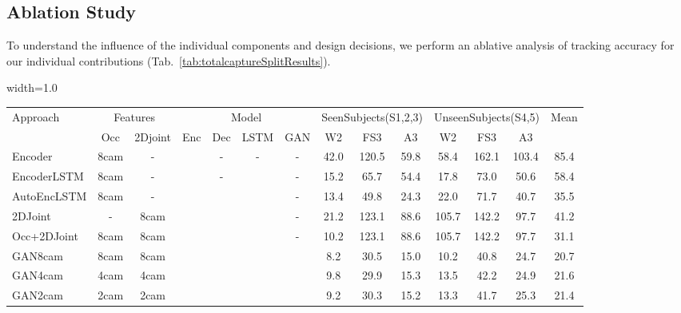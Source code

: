 \documentclass{bmvc2k}
\newcommand{\squeezeup}{\vspace{-2mm}}
\newcommand{\tick}{\checkmark}
\begin{document}
\squeezeup
\squeezeup
\subsection{Ablation Study}
To understand the influence of the individual components and design decisions, we perform an ablative analysis of tracking accuracy for our individual contributions (Tab.~\ref{tab:totalcaptureSplitResults}).
\begin{table*}[t]
\begin{adjustbox}{width=1.0\textwidth}
\centering

\small
\begin{tabular}{lccccccccccccc}

\hline
Approach &\multicolumn{2}{c}{Features}&\multicolumn{4}{c}{Model}& \multicolumn{3}{c}{SeenSubjects(S1,2,3)}&\multicolumn{3}{c}{UnseenSubjects(S4,5)} & Mean \\
                    &Occ  &2Djoint&Enc    &Dec    &LSTM&GAN   &W2    &FS3   & A3   &W2    &FS3    & A3 & \\ \hline
Encoder             &8cam &   -   &\tick  & -     & -  & -    & 42.0 & 120.5& 59.8 & 58.4 & 162.1 & 103.4 & 85.4  \\
EncoderLSTM         &8cam &  -    &\tick  &-      &\tick& -   & 15.2 &65.7  &54.4  &17.8  & 73.0 & 50.6 &  58.4   \\
AutoEncLSTM         &8cam & -     &\tick  &\tick  &\tick& -   & 13.4 & 49.8 & 24.3 & 22.0 & 71.7 & 40.7 & 35.5    \\
2DJoint             &-    & 8cam  &\tick  &\tick  &\tick& -   & 21.2 & 123.1& 88.6 & 105.7&142.2 & 97.7 & 41.2    \\
Occ+2DJoint         &8cam & 8cam  &\tick  &\tick  &\tick& -   & 10.2 & 123.1& 88.6 & 105.7&142.2 & 97.7 & 31.1    \\ \hline
GAN8cam            &8cam &8cam   &\tick  &\tick  &\tick&\tick& 8.2 & 30.5 & 15.0  & 10.2 & 40.8 & 24.7 & 20.7 \\ 
GAN4cam            &4cam &4cam   &\tick  &\tick  &\tick&\tick& 9.8 & 29.9 & 15.3  & 13.5 & 42.2 & 24.9 & 21.6 \\ 
GAN2cam            &2cam &2cam   &\tick  &\tick  &\tick&\tick& 9.2 & 30.3 & 15.2  & 13.3 & 41.7 & 25.3 & 21.4 \\ \hline

\end{tabular}
\end{adjustbox}

\caption{Ablation study of the Mean per joint error (mm). for the individual components on the TotalCapture dataset.}
\label{tab:totalcaptureSplitResults}
\squeezeup
\end{table*}
\end{document}
